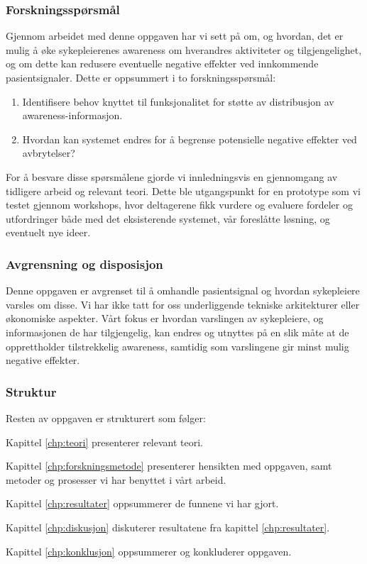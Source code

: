 \subsubsection{Forskningsspørsmål}
Gjennom arbeidet med denne oppgaven har vi sett på om, og hvordan, det er mulig å øke sykepleierenes awareness om hverandres aktiviteter og tilgjengelighet, og om dette kan redusere eventuelle negative effekter ved innkommende pasientsignaler. Dette er oppsummert i to forskningsspørsmål:

\begin{enumerate}
  \item Identifisere behov knyttet til funksjonalitet for støtte av distribusjon av awareness-informasjon.
  \item Hvordan kan systemet endres for å begrense potensielle negative effekter ved avbrytelser?
\end{enumerate}

\noindent
For å besvare disse spørsmålene gjorde vi innledningsvis en gjennomgang av tidligere arbeid og relevant teori. Dette ble utgangspunkt for en prototype som vi testet gjennom workshops, hvor deltagerene fikk vurdere og evaluere fordeler og utfordringer både med det eksisterende systemet, vår foreslåtte løsning, og eventuelt nye ideer. 

\subsubsection{Avgrensning og disposisjon}
Denne oppgaven er avgrenset til å omhandle pasientsignal og hvordan sykepleiere varsles om disse. Vi har ikke tatt for oss underliggende tekniske arkitekturer eller økonomiske aspekter. Vårt fokus er hvordan varslingen av sykepleiere, og informasjonen de har tilgjengelig, kan endres og utnyttes på en slik måte at de opprettholder tilstrekkelig awareness, samtidig som varslingene gir minst mulig negative effekter.

\subsubsection{Struktur}
Resten av oppgaven er strukturert som følger:

\noindent
Kapittel \ref{chp:teori} presenterer relevant teori.

\noindent
Kapittel \ref{chp:forskningsmetode} presenterer hensikten med oppgaven, samt metoder og prosesser vi har benyttet i vårt arbeid. 

\noindent
Kapittel \ref{chp:resultater} oppsummerer de funnene vi har gjort.

\noindent
Kapittel \ref{chp:diskusjon} diskuterer resultatene fra kapittel \ref{chp:resultater}.

\noindent
Kapittel \ref{chp:konklusjon} oppsummerer og konkluderer oppgaven.


